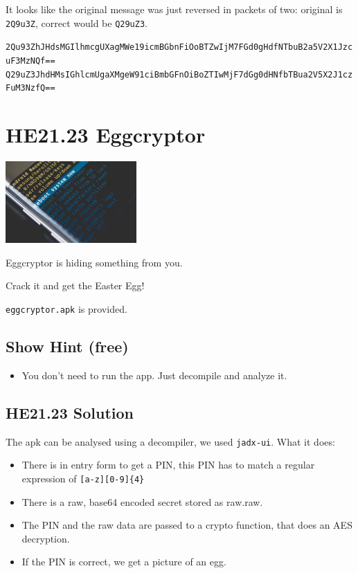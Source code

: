 \documentclass[english,a4paper,nols,noindent]{tufte-handout}
\begin{document}
It looks like the original message was just reversed in packets of two: original is \verb+2Q9u3Z+, correct would be \verb+Q29uZ3+.

\verb+2Qu93ZhJHdsMGIlhmcgUXagMWe19icmBGbnFiOoBTZwIjM7FGd0gHdfNTbuB2a5V2X1JzcuF3MzNQf==+
\verb+Q29uZ3JhdHMsIGhlcmUgaXMgeW91ciBmbGFnOiBoZTIwMjF7dGg0dHNfbTBua2V5X2J1czFuM3NzfQ==+

\hypertarget{he21.23}{%
  \section{HE21.23 Eggcryptor}
  \label{he21.23}}
\begin{marginfigure}
    \includegraphics[width=50mm]{images/challenge23.jpg}
\end{marginfigure}

\noindent Eggcryptor is hiding something from you.

Crack it and get the Easter Egg!

\verb+eggcryptor.apk+ is provided.
\subsection{Show Hint (free)}
\begin{itemize}
\item You don't need to run the app. Just decompile and analyze it.
\end{itemize}


\hypertarget{he21.23-solution}{%
\subsection{HE21.23 Solution}\label{he21.23-solution}}

\noindent The apk can be analysed using a decompiler, we used \verb+jadx-ui+.  What it does:
\begin{itemize} 
    \item There is in entry form to get a PIN, this PIN has to match a regular expression of \verb+[a-z][0-9]{4}+
    \item There is a raw, base64 encoded secret stored as raw.raw.
    \item The PIN and the raw data are passed to a crypto function, that does an AES decryption.
    \item If the PIN is correct, we get a picture of an egg.
\end{itemize}
\end{document}
